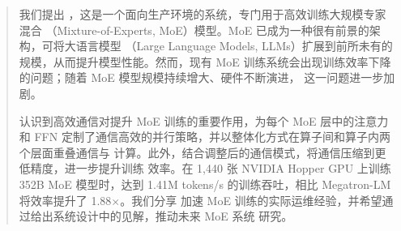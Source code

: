 \begin{abstract}

我们提出 \sysname，这是一个面向生产环境的系统，专门用于高效训练大规模专家混合
（Mixture-of-Experts, MoE）模型。MoE 已成为一种很有前景的架构，可将大语言模型
（Large Language Models, LLMs）扩展到前所未有的规模，从而提升模型性能。然而，现有
MoE 训练系统会出现训练效率下降的问题；随着 MoE 模型规模持续增大、硬件不断演进，
这一问题进一步加剧。
    
认识到高效通信对提升 MoE 训练的重要作用，\sysname 为每个 MoE 层中的注意力和
FFN 定制了通信高效的并行策略，并以整体化方式在算子间和算子内两个层面重叠通信与
计算。此外，\sysname 结合调整后的通信模式，将通信压缩到更低精度，进一步提升训练
效率。在 1,440 张 NVIDIA Hopper GPU 上训练 352B MoE 模型时，\sysname 达到
1.41M tokens/s 的训练吞吐，相比 Megatron-LM 将效率提升了 1.88$\times$。我们分享
加速 MoE 训练的实际运维经验，并希望通过给出系统设计中的见解，推动未来 MoE 系统
研究。
    
\end{abstract}
